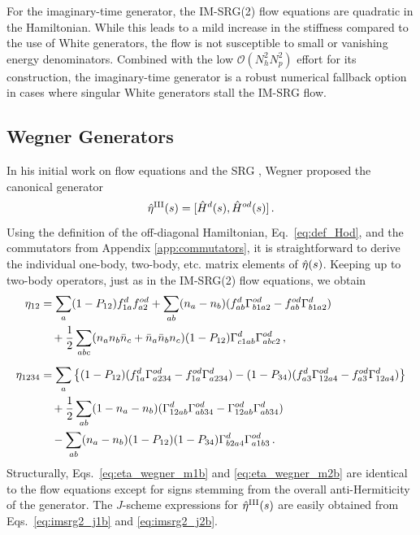 For the imaginary-time generator, the IM-SRG(2) flow equations are
quadratic in the Hamiltonian. While this leads to a mild increase in
the stiffness compared to the use of White generators, the flow is not
susceptible to small or vanishing energy denominators. Combined with
the low $\mathcal{O}(N_h^2N_p^2)$ effort for its construction, the
imaginary-time generator is a robust numerical fallback option in
cases where singular White generators stall the IM-SRG flow.


\subsection{\label{sec:generators_Wegner}Wegner Generators}
In his initial work on flow equations and the SRG \cite{wegner1994}, Wegner proposed the canonical generator 
\begin{equation}\label{eq:eta_wegner}
  \etaO^\text{III}(s) = \comm{\hat{H}^d(s)}{\hat{H}^{od}(s)}\,.
\end{equation}
Using the definition of the off-diagonal Hamiltonian,
Eq.~\eqref{eq:def_Hod}, and the commutators from Appendix
\ref{app:commutators}, it is straightforward to derive the individual
one-body, two-body, etc. matrix elements of $\hat{\eta}(s)$. Keeping up to
two-body operators, just as in the IM-SRG(2) flow equations, we obtain
\begin{align}
  \eta_{12} &= 
  \sum_{a}(1-P_{12})f^d_{1a}f^{od}_{a2} +\sum_{ab}(n_a-n_b)(f^d_{ab}\Gamma^{od}_{b1a2}-f^{od}_{ab}\Gamma^d_{b1a2}) \notag\\ 
  &\quad +\frac{1}{2} \sum_{abc}(n_an_b\bar{n}_c+\bar{n}_a\bar{n}_bn_c) (1-P_{12})\Gamma^d_{c1ab}\Gamma^{od}_{abc2}
  \label{eq:eta_wegner_m1b}\,,\\[5pt]
  \eta_{1234}&= 
  \sum_{a}\left\{ 
    (1-P_{12})(f^d_{1a}\Gamma^{od}_{a234}-f^{od}_{1a}\Gamma^{d}_{a234} )
    -(1-P_{34})(f^{d}_{a3}\Gamma^{od}_{12a4}-f^{od}_{a3}\Gamma^d_{12a4} )
    \right\}\notag \\
  &\quad+ \frac{1}{2}\sum_{ab}(1-n_a-n_b)(\Gamma^d_{12ab}\Gamma^{od}_{ab34}-\Gamma^{od}_{12ab}\Gamma^d_{ab34})\notag\\
  &\quad-\sum_{ab}(n_a-n_b) (1-P_{12})(1-P_{34})\Gamma^d_{b2a4}\Gamma^{od}_{a1b3}
    \label{eq:eta_wegner_m2b}\,.
\end{align}
Structurally, Eqs.~\eqref{eq:eta_wegner_m1b} and
\eqref{eq:eta_wegner_m2b} are identical to the flow equations except
for signs stemming from the overall anti-Hermiticity of the
generator. The $J$-scheme expressions for $\hat{\eta}^\text{III}(s)$ are
easily obtained from Eqs.~\eqref{eq:imsrg2_j1b} and
\eqref{eq:imsrg2_j2b}.

